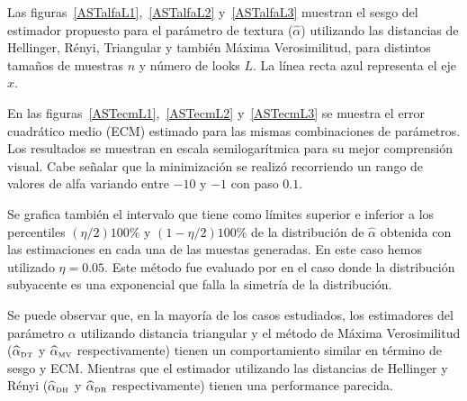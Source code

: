 Las figuras~\ref{ASTalfaL1},~\ref{ASTalfaL2} y~\ref{ASTalfaL3} muestran el sesgo del estimador propuesto para el parámetro de textura ($\widehat{\alpha}$) utilizando las distancias de Hellinger, Rényi, Triangular y también Máxima Verosimilitud, para distintos tamaños de muestras $n$ y número de looks $L$. 
La línea recta azul representa el eje $x$. 

En las figuras~\ref{ASTecmL1},~\ref{ASTecmL2} y~\ref{ASTecmL3} se muestra el error cuadrático medio (ECM) estimado para las mismas combinaciones de parámetros. Los resultados se muestran en escala semilogarítmica para su mejor comprensión visual.
Cabe señalar que la minimización se realizó recorriendo un rango de valores de alfa variando entre $-10$ y $-1$ con paso  $0.1$. 



Se grafica también el intervalo que tiene como límites superior e inferior a los percentiles $(\eta/2) 100\%$ y $(1-\eta/2) 100\%$ de la distribución de $\widehat{\alpha}$ obtenida con las estimaciones en cada una de las muestas generadas. En este caso hemos utilizado $\eta=0.05$. Este método fue evaluado por \citet{Buckland1983} en el caso donde la distribución subyacente es una exponencial que falla la simetría de la distribución. 

 Se puede observar que, en la mayoría de los casos estudiados, los estimadores del parámetro $\alpha$ utilizando distancia triangular y el método de Máxima Verosimilitud ($\widehat{\alpha}_{\text{\tiny{DT}}}$ y $\widehat{\alpha}_{\text{\tiny{MV}}}$ respectivamente) tienen un comportamiento similar en término de sesgo y ECM. Mientras que  el estimador utilizando las distancias de Hellinger y Rényi ($\widehat{\alpha}_{\text{\tiny{DH}}}$ y $\widehat{\alpha}_{\text{\tiny{DR}}}$ respectivamente) tienen una performance parecida. 
 
